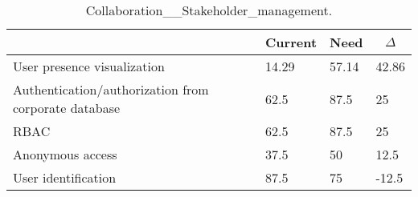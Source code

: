 
  \begin{table*}[]
  \centering
  \notsotiny
  \caption{ Collaboration__Stakeholder_management.}
\label{tab:collaboration__stakeholder_management}
\begin{tabular}{|l|l|l|l|}
  \hline
  \rowcolor[HTML]{C0C0C0}
    \multicolumn{1}{|c|}{Feature} & \multicolumn{1}{c|}{Current} & \multicolumn{1}{c|}{Need} & \multicolumn{1}{c|}{$\Delta$} \\ \hline
  User presence visualization & 14.29 & 57.14 & 42.86 \\ \hline 
Authentication/authorization from corporate database & 62.5 & 87.5 & 25 \\ \hline 
RBAC & 62.5 & 87.5 & 25 \\ \hline 
Anonymous access & 37.5 & 50 & 12.5 \\ \hline 
User identification & 87.5 & 75 & -12.5 \\ \hline 
\end{tabular}%
  \end{table*}